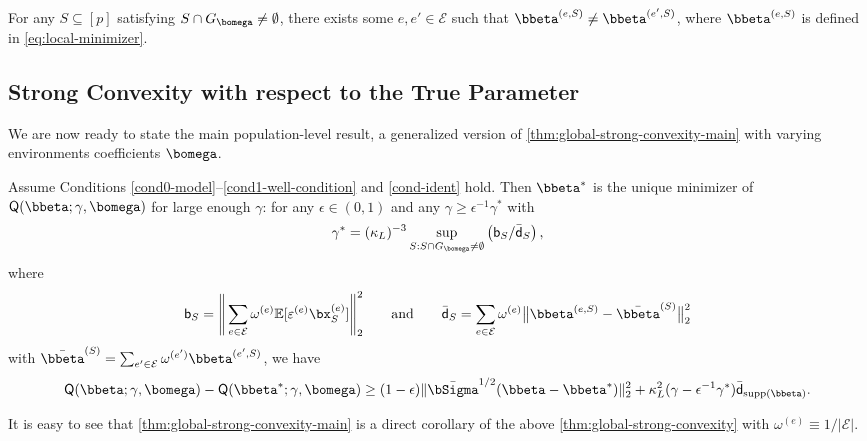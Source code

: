 \documentclass[10pt]{article}
\numberwithin{equation}{section}
\newcommand*{\supp}{\mathrm{supp}}
\begin{document}
\begin{condition}[Identification]
\label{cond-ident}
    For any $S\subseteq [p]$ satisfying $S \cap G_{\bomega} \neq \emptyset$, there exists some $e, e'\in \mathcal{E}$ such that $\bbeta^{(e, S)} \neq \bbeta^{(e',S)}$, where $\bbeta^{(e,S)}$ is defined in \eqref{eq:local-minimizer}.
\end{condition} 

\subsection{Strong Convexity with respect to the True Parameter}

We are now ready to state the main population-level result, a generalized version of \cref{thm:global-strong-convexity-main} with varying environments coefficients $\bomega$.

\begin{theorem} 
\label{thm:global-strong-convexity}
Assume Conditions \ref{cond0-model}--\ref{cond1-well-condition} and \ref{cond-ident} hold. Then $\bbeta^*$ is the unique minimizer of $\mathsf{Q}(\bbeta;\gamma,\bomega)$ for large enough $\gamma$: for any $\epsilon \in (0, 1)$ and any $\gamma\ge \epsilon^{-1} \gamma^*$ with
\begin{align}
\label{eq:thm1-gamma-star}
	\gamma^* = (\kappa_L)^{-3} \sup_{S: S\cap G_{\bomega} \neq \emptyset} \left(\mathsf{b}_S/\bar{\mathsf{d}}_S\right),
\end{align} where
\begin{align}
\label{eq:def-bias-bias-difference}
 \mathsf{b}_S = \Bigg\|\sum_{e\in \mathcal{E}} \omega^{(e)} \mathbb{E} [\varepsilon^{(e)} \bx_S^{(e)}]\Bigg\|^2_2 \qquad \text{and} \qquad \bar{\mathsf{d}}_S = \sum_{e\in \mathcal{E}} \omega^{(e)} \big\|\bbeta^{(e,S)} - \bar{\bbeta}^{(S)}\big\|_2^2  
\end{align} 
 with $\bar{\bbeta}^{(S)}=\sum_{e'\in \mathcal{E}} \omega^{(e')} \bbeta^{(e',S)}$, we have
\begin{align}
\label{eq:thm1-jsc-condition}
	\mathsf{Q}(\bbeta;\gamma, \bomega) - \mathsf{Q}(\bbeta^*;\gamma, \bomega) \ge (1-\epsilon) \|\bar{\bSigma}^{1/2}(\bbeta - \bbeta^*)\|_2^2 + \kappa_L^2 (\gamma - \epsilon^{-1}\gamma^*) \bar{\mathsf{d}}_{\supp(\bbeta)}.
\end{align}
\end{theorem}

It is easy to see that \cref{thm:global-strong-convexity-main} is a direct corollary of the above \cref{thm:global-strong-convexity} with $\omega^{(e)} \equiv 1 / |\mathcal{E}|$.
\end{document}
